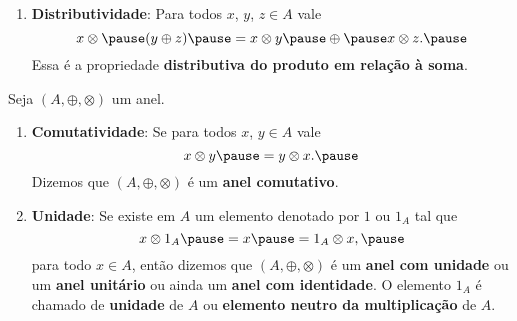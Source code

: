 \documentclass{beamer}
\begin{document}
    \begin{frame}
        \begin{definicao}
            \begin{enumerate}[label={\roman*})]
                \conti

                \item \textbf{Distributividade}: \pause Para todos $x$, \pause $y$, \pause $z \in A$ \pause vale\pause
                \[
                    x \otimes \pause (y \oplus z) \pause = x \otimes y \pause \oplus \pause x\otimes z.\pause
                \]
                Essa é a propriedade \textbf{distributiva do produto em relação à soma}.
            \end{enumerate}
        \end{definicao}
    \end{frame}

    \begin{frame}
        \begin{observacoes}
            Seja $(A, \oplus, \otimes)$ \pause um anel.\pause
            \begin{enumerate}[label={\arabic*})]
                \item \textbf{Comutatividade}: Se para todos $x$, \pause $y \in A$ \pause vale
                \[
                    x \otimes y \pause = y \otimes x.\pause
                \]
                Dizemos que $(A, \oplus, \otimes)$ \pause é um \textbf{anel comutativo}.\pause

                \vspace{.7cm}

                \item \textbf{Unidade}: \pause Se existe em $A$ \pause um elemento denotado por $1$ \pause ou $1_{A}$
                    \pause tal que\pause
                \[
                    x \otimes 1_A \pause = x \pause = 1_A \otimes x,\pause
                \]
                para todo $x \in A$, \pause então dizemos que $(A, \oplus, \otimes)$ \pause é um \textbf{anel com
                unidade} \pause ou um \textbf{anel unitário} ou ainda um \textbf{anel com identidade}. \pause O
                elemento $1_A$ \pause é chamado de \textbf{unidade} de $A$ \pause ou \textbf{elemento neutro da
                multiplicação} \pause de $A$.

                \vspace{.7cm}

                \seti
             \end{enumerate}
        \end{observacoes}
    \end{frame}
\end{document}
